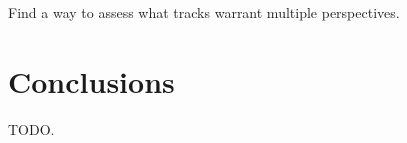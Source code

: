\documentclass{article}
\begin{document}
Find a way to assess what tracks warrant multiple perspectives.

\section{Conclusions}

TODO.








\end{document}
